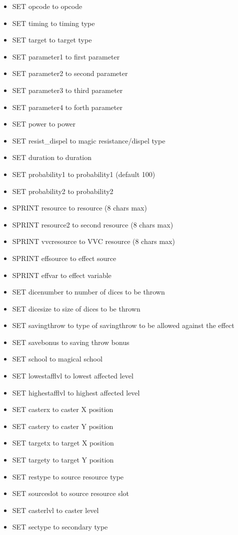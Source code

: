 \documentclass{article}
\begin{document}
\begin{itemize}
\item SET opcode to opcode
\item SET timing to timing type
\item SET target to target type
\item SET parameter1 to first parameter
\item SET parameter2 to second parameter
\item SET parameter3 to third parameter
\item SET parameter4 to forth parameter
\item SET power to power
\item SET resist_dispel to magic resistance/dispel type
\item SET duration to duration
\item SET probability1 to probability1 (default 100)
\item SET probability2 to probability2
\item SPRINT resource to resource (8 chars max)
\item SPRINT resource2 to second resource (8 chars max)
\item SPRINT vvcresource to VVC resource (8 chars max)
\item SPRINT effsource to effect source
\item SPRINT effvar to effect variable
\item SET dicenumber to number of dices to be thrown
\item SET dicesize to size of dices to be thrown
\item SET savingthrow to type of savingthrow to be allowed against the effect
\item SET savebonus to saving throw bonus
\item SET school to magical school
\item SET lowestafflvl to lowest affected level
\item SET highestafflvl to highest affected level
\item SET casterx to caster X position
\item SET castery to caster Y position
\item SET targetx to target X position
\item SET targety to target Y position
\item SET restype to source resource type
\item SET sourceslot to source resource slot
\item SET casterlvl to caster level
\item SET sectype to secondary type
\end{itemize}
\end{document}
